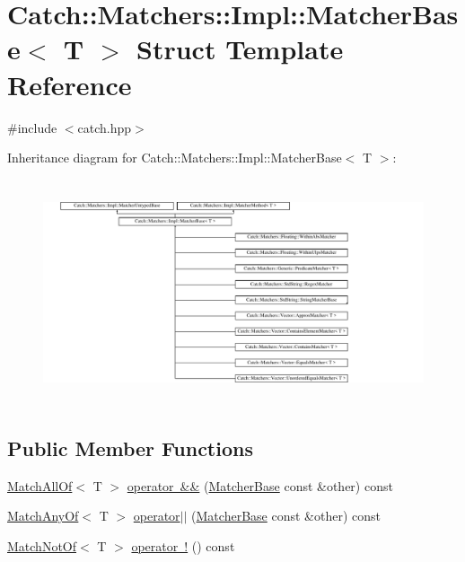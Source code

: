 \hypertarget{struct_catch_1_1_matchers_1_1_impl_1_1_matcher_base}{}\section{Catch\+::Matchers\+::Impl\+::Matcher\+Base$<$ T $>$ Struct Template Reference}
\label{struct_catch_1_1_matchers_1_1_impl_1_1_matcher_base}


{\ttfamily \#include $<$catch.\+hpp$>$}

Inheritance diagram for Catch\+::Matchers\+::Impl\+::Matcher\+Base$<$ T $>$\+:\begin{figure}[H]
\begin{center}
\leavevmode
\includegraphics[height=6.646884cm]{struct_catch_1_1_matchers_1_1_impl_1_1_matcher_base}
\end{center}
\end{figure}
\subsection*{Public Member Functions}
\begin{DoxyCompactItemize}
\item 
\mbox{\hyperlink{struct_catch_1_1_matchers_1_1_impl_1_1_match_all_of}{Match\+All\+Of}}$<$ T $>$ \mbox{\hyperlink{struct_catch_1_1_matchers_1_1_impl_1_1_matcher_base_aac4472c84f76c242ab4467f02e2ef8cc}{operator \&\&}} (\mbox{\hyperlink{struct_catch_1_1_matchers_1_1_impl_1_1_matcher_base}{Matcher\+Base}} const \&other) const
\item 
\mbox{\hyperlink{struct_catch_1_1_matchers_1_1_impl_1_1_match_any_of}{Match\+Any\+Of}}$<$ T $>$ \mbox{\hyperlink{struct_catch_1_1_matchers_1_1_impl_1_1_matcher_base_a5f8542b8f1567a6f9c65d0a6da7b679b}{operator$\vert$$\vert$}} (\mbox{\hyperlink{struct_catch_1_1_matchers_1_1_impl_1_1_matcher_base}{Matcher\+Base}} const \&other) const
\item 
\mbox{\hyperlink{struct_catch_1_1_matchers_1_1_impl_1_1_match_not_of}{Match\+Not\+Of}}$<$ T $>$ \mbox{\hyperlink{struct_catch_1_1_matchers_1_1_impl_1_1_matcher_base_ab2ca564bb42ceaf8dbaf3426583bb28e}{operator !}} () const
\end{DoxyCompactItemize}

